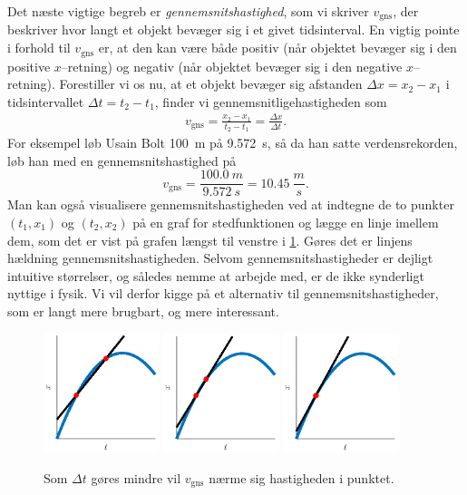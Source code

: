 Det næste vigtige begreb er \emph{gennemsnitshastighed}, som vi skriver $v_\text{gns}$, der beskriver hvor langt et objekt bevæger sig i et givet tidsinterval. En vigtig pointe i forhold til $v_\text{gns}$ er, at den kan være både positiv (når objektet bevæger sig i den positive $x$--retning) og negativ (når objektet bevæger sig i den negative $x$--retning). Forestiller vi os nu, at et objekt bevæger sig afstanden $\Delta x = x_2 - x_1$ i tidsintervallet $\Delta t = t_2-t_1$, finder vi gennemsnitligehastigheden som 
\begin{align}
    v_\text{gns}=\frac{x_2-x_1}{t_2-t_1}=\frac{\Delta x}{\Delta t}.
    \label{mat:eq:gnshast}
\end{align}
For eksempel løb Usain Bolt \SI{100}{m} på \SI{9,572}{s}, så da han satte verdensrekorden, løb han med en gennemsnitshastighed på
\begin{equation*}
    v_\text{gns}=\frac{\SI{100.0}{m}}{\SI{9.572}{s}}=\SI{10.45}{\frac{m}{s}}  .
\end{equation*}
Man kan også visualisere gennemsnitshastigheden ved at indtegne de to punkter $(t_1,x_1)$ og $(t_2,x_2)$ på en graf for stedfunktionen og lægge en linje imellem dem, som det er vist på grafen længst til venstre i \cref{mat:fig:diff1}. Gøres det er linjens hældning gennemsnitshastigheden. Selvom gennemsnitshastigheder er dejligt intuitive størrelser, og således nemme at arbejde med, er de ikke synderligt nyttige i fysik. Vi vil derfor kigge på et alternativ til gennemsnitshastigheder, som er langt mere brugbart, og mere interessant.   
\begin{figure}[H]
    \centering
    \includegraphics[width=0.3\textwidth]{matfig/gnshast.eps}
    \includegraphics[width=0.3\textwidth]{matfig/gnshast2.eps}
    \includegraphics[width=0.3\textwidth]{matfig/hast.eps}
    \caption{Som $\Delta t$ gøres mindre vil $v_\text{gns}$ nærme sig hastigheden i punktet.}
    \label{mat:fig:diff1}
\end{figure}

